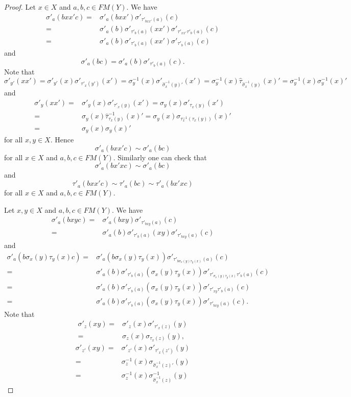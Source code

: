\begin{proof}
Let $x\in X$ and $a,b,c\in FM(Y)$. We have
\begin{align*}
    \sigma'_a(bxx'c)=&\sigma'_a(bxx')\sigma'_{\tau'_{bxx'}(a)}(c)\\
    =&\sigma'_a(b)\sigma'_{\tau'_{b}(a)}(xx')\sigma'_{\tau'_{xx'}\tau'_b(a)}(c)\\
    =&\sigma'_a(b)\sigma'_{\tau'_b(a)}(xx')\sigma'_{\tau'_b(a)}(c)
\end{align*}
and
\[ \sigma'_a(bc)=\sigma'_a(b)\sigma'_{\tau'_{b}(a)}(c).
\]
Note that $\sigma'_{y'}(xx')=\sigma'_{y'}(x)\sigma'_{\tau'_{x}(y')}(x')
=\sigma^{-1}_{y}(x)\sigma'_{\widehat{\sigma}^{-1}_{x}(y)'}(x')
=\sigma^{-1}_{y}(x)\widehat{\tau}_{\widehat{\sigma}^{-1}_{x}(y)}(x)'
=\sigma^{-1}_{y}(x)\sigma^{-1}_{y}(x)'$ and \begin{align*}\sigma'_{y}(xx')=&\sigma'_{y}(x)\sigma'_{\tau'_{x}(y)}(x')=\sigma_y(x)\sigma'_{\tau_x(y)}(x')\\
=&\sigma_y(x)\widehat{\tau}^{-1}_{\tau_x(y)}(x)'=\sigma_y(x)\sigma_{\tau_x^{-1}(\tau_x(y))}(x)'\\
=&\sigma_y(x)\sigma_{y}(x)'
\end{align*} 
for all $x,y\in X$. Hence
\[\sigma'_a(bxx'c)\sim\sigma'_a(bc)\]
for all $x\in X$ and $a,b,c\in FM(Y)$. Similarly one can check that
\[ \sigma'_{a}(bx'xc)\sim\sigma'_{a}(bc)\]
and 
\[ \tau'_{a}(bxx'c)\sim\tau'_{a}(bc)\sim \tau'_a(bx'xc)\]
for all $x\in X$ and $a,b,c\in FM(Y)$.

Let $x,y\in X$ and $a,b,c\in FM(Y)$. We have 
\begin{align*}
    \sigma'_a(bxyc)=&\sigma'_a(bxy)\sigma'_{\tau'_{bxy}(a)}(c)\\
    =&\sigma'_a(b)\sigma'_{\tau'_b(a)}(xy)\sigma'_{\tau'_{bxy}(a)}(c)
\end{align*}
and
\begin{align*}
    \sigma'_a(b\sigma_x(y)\tau_y(x)c)=&\sigma'_a(b\sigma_x(y)\tau_y(x))\sigma'_{\tau'_{b\sigma_x(y)\tau_y(x)}(a)}(c)\\
    =&\sigma'_a(b)\sigma'_{\tau'_b(a)}(\sigma_x(y)\tau_y(x))\sigma'_{\tau'_{\sigma_x(y)\tau_y(x)}\tau'_b(a)}(c)\\
    =&\sigma'_a(b)\sigma'_{\tau'_b(a)}(\sigma_x(y)\tau_y(x))\sigma'_{\tau'_{xy}\tau'_b(a)}(c)\\
    =&\sigma'_a(b)\sigma'_{\tau'_b(a)}(\sigma_x(y)\tau_y(x))\sigma'_{\tau'_{bxy}(a)}(c).
\end{align*}
Note that
\begin{align}\label{eq:LYZ1}
    \sigma'_z(xy)=&\sigma'_z(x)\sigma'_{\tau'_x(z)}(y)\nonumber\\
    =&\sigma_z(x)\sigma_{\tau_x(z)}(y),
\end{align}
\begin{align}\label{eq:LYZ2}
    \sigma'_{z'}(xy)=&\sigma'_{z'}(x)\sigma'_{\tau'_x(z')}(y)\nonumber\\
    =&\sigma^{-1}_z(x)\sigma_{\widehat{\sigma}^{-1}_x(z)'}(y)\nonumber\\
    =&\sigma^{-1}_z(x)\sigma^{-1}_{\widehat{\sigma}^{-1}_x(z)}(y)
\end{align}


\end{proof}
